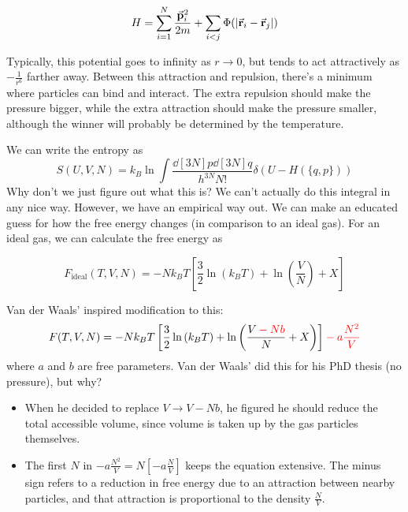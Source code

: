\documentclass[a4paper,twoside,master.tex]{subfiles}
\begin{document}

\begin{equation}
    H = \sum_{i=1}^{N} \frac{\va{p}_i^2}{2m} + \sum_{i<j} \Phi(\abs{\va{r}_i - \va{r}_j})
\end{equation}

Typically, this potential goes to infinity as $ r \to 0 $, but tends to act attractively as $ - \frac{1}{r^6} $ farther away. Between this attraction and repulsion, there's a minimum where particles can bind and interact. The extra repulsion should make the pressure bigger, while the extra attraction should make the pressure smaller, although the winner will probably be determined by the temperature.

We can write the entropy as
\begin{equation}
    S(U,V,N) = k_B\ln{\int \frac{\dd[3N]{p} \dd[3N]{q}}{h^{3N} N!} \delta(U-H(\{q,p\}))}
\end{equation}
Why don't we just figure out what this is? We can't actually do this integral in any nice way. However, we have an empirical way out. We can make an educated guess for how the free energy changes (in comparison to an ideal gas). For an ideal gas, we can calculate the free energy as

\begin{equation}
    F_{\text{ideal}}(T,V,N) = -N k_B T \left[ \frac{3}{2} \ln\left( k_B T \right) + \ln\left( \frac{V}{N} \right) + X \right]
\end{equation}

Van der Waals' inspired modification to this:
\begin{equation}
    F(T,V,N) = - N k_B T \left[ \frac{3}{2} \ln\left( k_BT \right) + \ln\left( \frac{V\color{red}-Nb\color{black}}{N} + X \right) \right] \color{red}- a \frac{N^2}{V}\color{black}
\end{equation}
where $ a $ and $ b $ are free parameters. Van der Waals' did this for his PhD thesis (no pressure), but why? 

\begin{itemize}
    \item When he decided to replace $ V \to V-Nb $, he figured he should reduce the total accessible volume, since volume is taken up by the gas particles themselves.
    \item The first $ N $ in $ - a \frac{N^2}{V} = N \left[ -a \frac{N}{V} \right] $ keeps the equation extensive. The minus sign refers to a reduction in free energy due to an attraction between nearby particles, and that attraction is proportional to the density $ \frac{N}{V} $.
\end{itemize}
\end{document}
